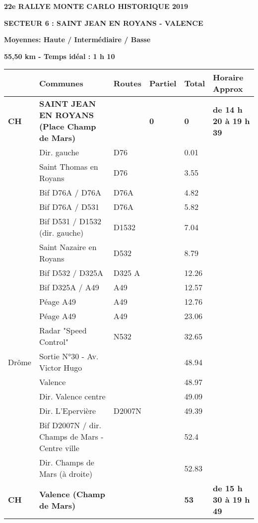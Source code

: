 \documentclass{article}%
\begin{document}
%
\normalsize%
\begin{center} \textbf{\LARGE{22e RALLYE MONTE CARLO HISTORIQUE 2019}} \end{center}%
\begin{flushleft} \textbf{SECTEUR 6 : SAINT JEAN EN ROYANS - VALENCE 
} \end{flushleft}%
\begin{flushright} \textbf{             Moyennes: Haute / Intermédiaire / Basse
} \end{flushright}%
\begin{flushright} \textbf{55,50 km - Temps idéal : 1 h 10
} \end{flushright}%
\begin{longtable}{p{2.25cm}|p{7.0cm}|p{1.5cm}|p{1.5cm}|p{1.5cm}|p{3.5cm}}%
\hline%
&Communes&Routes&Partiel&Total&Horaire Approx\\%
\hline%
\endhead%
\endfoot%
\endlastfoot%
\textbf{﻿CH}&\textbf{SAINT JEAN EN ROYANS (Place Champ de Mars)}& &\textbf{0}&\textbf{0}&\textbf{de 14 h 20 à 19 h 39}\\%
 &Dir. gauche&D76& &0.01& \\%
 &Saint Thomas en Royans&D76 & &3.55& \\%
 &Bif D76A / D76A&D76A& &4.82& \\%
 &Bif D76A / D531&D76A& &5.82& \\%
 &Bif D531 / D1532 (dir. gauche)&D1532& &7.04& \\%
 &Saint Nazaire en Royans&D532& &8.79& \\%
 &Bif D532 / D325A&D325 A& &12.26& \\%
 &Bif D325A / A49&A49& &12.57& \\%
 &Péage A49&A49& &12.76& \\%
 &Péage A49&A49& &23.06& \\%
 &Radar "Speed Control"&N532& &32.65& \\%
Drôme&Sortie N°30 - Av. Victor Hugo& & &48.94& \\%
 &Valence & & &48.97& \\%
 &Dir. Valence centre& & &49.09& \\%
 &Dir. L'Epervière &D2007N& &49.39& \\%
 &Bif D2007N / dir. Champs de Mars - Centre ville& & &52.4& \\%
 &Dir. Champs de Mars (à droite)& & &52.83& \\%
\textbf{CH}&\textbf{Valence (Champ de Mars)}& & &\textbf{53}&\textbf{de 15 h 30 à 19 h 49}\\%
\hline%
\end{longtable}%
\end{document}
